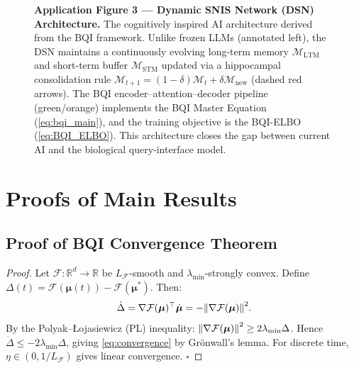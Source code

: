 \documentclass[12pt,a4paper]{article}
\theoremstyle{plain}
\theoremstyle{definition}
\theoremstyle{remark}
\newcommand{\vF}{\mathcal{F}}
\newcommand{\R}{\mathbb{R}}
\begin{document}
\begin{figure}[H]
\caption{\textbf{Application Figure 3 — Dynamic SNIS Network (DSN) Architecture.}
  The cognitively inspired AI architecture derived from the BQI framework.
  Unlike frozen LLMs (annotated left), the DSN maintains a continuously
  evolving long-term memory $\mathcal{M}_\mathrm{LTM}$ and short-term buffer
  $\mathcal{M}_\mathrm{STM}$ updated via a hippocampal consolidation rule
  $\mathcal{M}_{t+1} = (1-\delta)\mathcal{M}_t + \delta\mathcal{M}_\mathrm{new}$
  (dashed red arrows).  The BQI encoder–attention–decoder pipeline (green/orange)
  implements the BQI Master Equation (\ref{eq:bqi_main}), and the training objective
  is the BQI-ELBO (\ref{eq:BQI_ELBO}).  This architecture closes the gap between
  current AI and the biological query-interface model.}
\label{fig:dsn_architecture}
\end{figure}


\section{Proofs of Main Results}
\label{app:proofs}

\subsection{Proof of BQI Convergence Theorem}

\begin{proof}
Let $\vF : \R^d \to \R$ be $L_\vF$-smooth and $\lambda_{\min}$-strongly convex.
Define $\Delta(t) = \vF(\bm{\mu}(t)) - \vF(\bm{\mu}^*)$. Then:
\begin{equation}
  \dot\Delta = \nabla\vF(\bm{\mu})^\top\dot{\bm{\mu}} = -\norm{\nabla\vF(\bm{\mu})}^2.
\end{equation}
By the Polyak--Łojasiewicz (PL) inequality:
$\norm{\nabla\vF(\bm{\mu})}^2 \geq 2\lambda_{\min}\Delta$.
Hence $\dot\Delta \leq -2\lambda_{\min}\Delta$, giving \cref{eq:convergence}
by Grönwall's lemma. For discrete time, $\eta \in (0, 1/L_\vF)$ gives linear convergence. $\square$
\end{proof}
\end{document}
